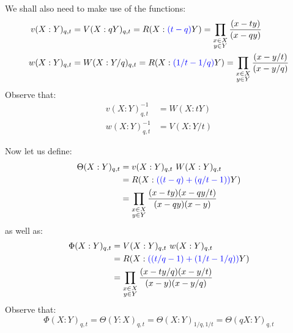 \documentclass[12pt,dvips]{amsart}
\begin{document}

\medskip
\noindent
We shall also need to make use of the functions:
\begin{align*}
v(X : Y)_{q,t} & =  V(X : qY)_{q, t} = R(X: {\color{blue}(t - q)} Y) = \prod_{\substack{x \in X \\ y \in Y}} \frac{(x - ty)}{(x-qy)} \\
w(X : Y)_{q,t} & =  W(X : Y/q)_{q,t} = R(X : {\color{blue}(1/t-1/q)} Y) = \prod_{\substack{x \in X \\ y \in Y}} \frac{(x - y/t)}{(x-y/q)}
\end{align*}
Observe that:
\begin{align*}
v( X : Y)_{q,t}^{-1} & =  W( X : tY) \\
w( X : Y)_{q,t}^{-1} & =  V( X : Y/t)
\end{align*}



\bigskip\bigskip
\noindent	
Now let us define:
\begin{align*}
\Theta(X : Y)_{q,t} & =  v(X : Y)_{q,t} \,\, W(X : Y)_{q,t} \\
& =  R(X : {\color{blue}((t - q) + (q/t - 1))} Y)\\
& =  \prod_{\substack{x \in X \\ y \in Y}} \frac{(x - ty)(x - qy/t)}{(x - qy)(x - y)}
\end{align*}
as well as:
\begin{align*}
\Phi(X : Y)_{q,t} & = V(X : Y)_{q,t} \,\, w(X : Y)_{q,t} \\
& =  R(X : {\color{blue}((t/q - 1) + (1/t - 1/q))} Y)\\
& =  \prod_{\substack{x \in X \\ y \in Y}} \frac{(x - ty/q)(x - y/t)}{(x - y)(x - y/q)}
\end{align*}
Observe that:
$$ \Phi(X : Y)_{q,t} = \Theta(Y : X)_{q,t} = \Theta(X : Y)_{1/q, 1/t} = \Theta(qX : Y)_{q,t} $$
\end{document}
